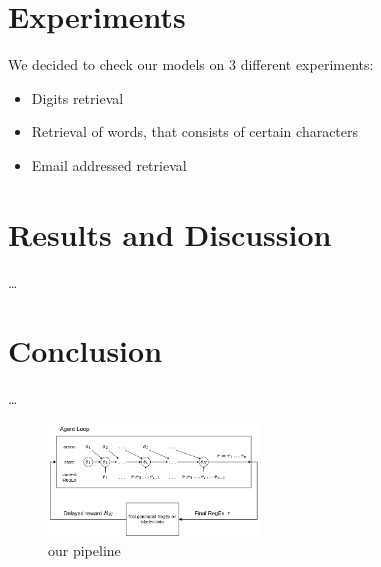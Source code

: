 \documentclass{article}
\begin{document}
\begin{algorithm}
\begin{algorithmic}[0]
    \EndFor
  \EndFor
  \State{}
\end{algorithmic}
\end{algorithm}

\section{Experiments}
We decided to check our models on 3 different experiments:
\begin{itemize}
  \item Digits retrieval
  \item Retrieval of words, that consists of certain characters
  \item Email addressed retrieval
\end{itemize}

\section{Results and Discussion}
\dots

\section{Conclusion}
\dots

\begin{figure}[H]
  \centering
    \includegraphics[width=0.5\textwidth]{./pictures/pipeline.png}
    \caption[our pipeline]{our pipeline}\label{fig:pipeline}
\end{figure}
\end{document}
